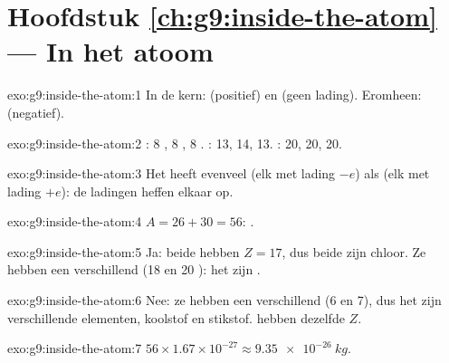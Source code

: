 \section*{Hoofdstuk \ref{ch:g9:inside-the-atom} --- In het atoom}

\begin{solution}{exo:g9:inside-the-atom:1}
In de kern:  (positief) en  (geen lading). Eromheen:
 (negatief).
\end{solution}

\begin{solution}{exo:g9:inside-the-atom:2}
: 8 , 8 , 8 .
: 13, 14, 13. : 20, 20, 20.
\end{solution}

\begin{solution}{exo:g9:inside-the-atom:3}
Het heeft evenveel  (elk met lading $-e$) als  (elk
met lading $+e$): de ladingen heffen elkaar op.
\end{solution}

\begin{solution}{exo:g9:inside-the-atom:4}
$A = 26 + 30 = 56$: .
\end{solution}

\begin{solution}{exo:g9:inside-the-atom:5}
Ja: beide hebben $Z = 17$, dus beide zijn chloor. Ze hebben een
verschillend  (18 en 20 ): het zijn .
\end{solution}

\begin{solution}{exo:g9:inside-the-atom:6}
Nee: ze hebben een verschillend  (6 en 7), dus het zijn
verschillende elementen, koolstof en stikstof.  hebben dezelfde
$Z$.
\end{solution}

\begin{solution}{exo:g9:inside-the-atom:7}
$56 \times 1.67 \times 10^{-27} \approx \qty{9.35e-26}{kg}$.
\end{solution}

